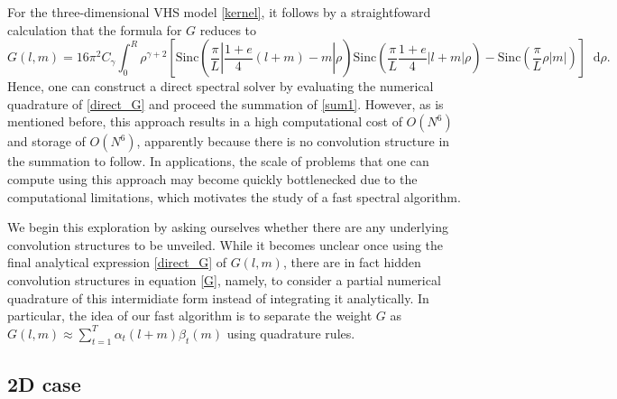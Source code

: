 \documentclass[review, times]{elsarticle}
\newcommand*\diff{\mathop{}\!\mathrm{d}}
\begin{document}
For the three-dimensional VHS model \eqref{kernel}, it follows by a straightfoward calculation that the formula for $G$ reduces to
\begin{equation} \label{direct_G}
G(l,m)=16\pi^2C_{\gamma}\int_0^R \rho^{\gamma+2}\left[\text{Sinc}\left(\frac{\pi}{L}\left|\frac{1+e}{4}(l+m)-m\right|\rho\right)\text{Sinc}\left(\frac{\pi}{L}\frac{1+e}{4}|l+m|\rho\right)-\text{Sinc}\left(\frac{\pi}{L}\rho|m|\right)\right]\diff\rho.
\end{equation}
Hence, one can construct a direct spectral solver by evaluating the numerical quadrature of \eqref{direct_G} and proceed the summation of \eqref{sum1}. However, as is mentioned before, this approach results in a high computational cost of $O(N^6)$ and storage of $O(N^6)$, apparently because there is no convolution structure in the summation to follow. In applications, the scale of problems that one can compute using this approach may become quickly bottlenecked due to the computational limitations, which motivates the study of a fast spectral algorithm. 

We begin this exploration by asking ourselves whether there are any underlying convolution structures to be unveiled. While it becomes unclear once using the final analytical expression \eqref{direct_G} of $G(l,m)$, there are in fact hidden convolution structures in equation \eqref{G}, namely, to consider a partial numerical quadrature of this intermidiate form instead of integrating it analytically. In particular, the idea of our fast algorithm is to separate the weight $G$ as $G(l,m)\approx\sum_{t=1}^T\alpha_t(l+m)\beta_t(m)$ using quadrature rules.

\subsection{2D case}
\end{document}
